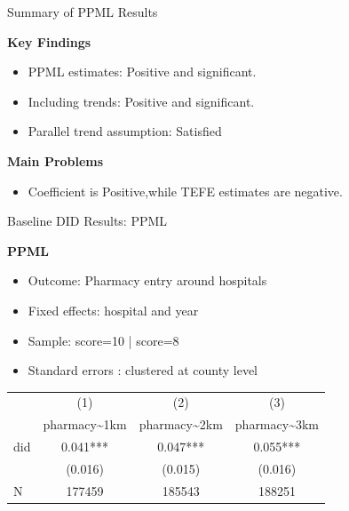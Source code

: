 \documentclass{beamer}
\begin{document}

\begin{frame}{Summary of PPML Results}

\textbf{Key Findings}

\begin{itemize}  
\item PPML  estimates: Positive and significant.
\item Including  trends: Positive and significant.
\item Parallel trend assumption: Satisfied
\end{itemize}

\textbf{Main  Problems}
\begin{itemize}
    \item Coefficient is Positive,while TEFE estimates are negative.
\end{itemize}

\end{frame}



\begin{frame}{Baseline DID Results: PPML}

\textbf{PPML}

\begin{itemize}
    \item Outcome: Pharmacy entry around hospitals
    \item Fixed effects: hospital and year
    \item Sample: score=10 | score=8
    \item Standard errors : clustered at county level
\end{itemize}

\vspace{0.5em}
\centering
\footnotesize
\begin{tabular}{lccc}
\hline
\hline
 & (1) & (2) & (3) \\
 & pharmacy\textasciitilde 1km & pharmacy\textasciitilde 2km & pharmacy\textasciitilde 3km \\
\hline
did & 0.041*** & 0.047*** & 0.055*** \\
 & (0.016) & (0.015) & (0.016) \\
\hline
N &  177459  & 185543 &  188251  \\
\hline
\hline
\end{tabular}

\end{frame}
\end{document}
